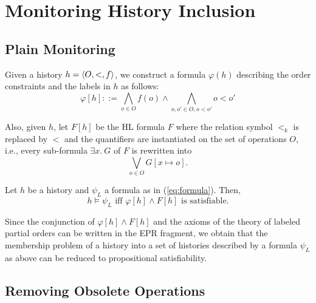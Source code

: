 
\section{Monitoring History Inclusion}

\subsection{Plain Monitoring}

Given a history $h=\left\langle {O,<,f} \right\rangle$, we construct a formula $\varphi(h)$ describing the order constraints
and the labels in $h$ as follows:
\[
\varphi[h]::= \bigwedge_{o\in O} f(o)\land \bigwedge_{o,o'\in O, o<o'} o< o'
\]

Also, given $h$, let $F[h]$ be the HL formula $F$ where the relation symbol $<_k$ is replaced by $<$
and the quantifiers are instantiated on the set of operations $O$, 
i.e., every sub-formula $\exists x.\ G$ of $F$ is rewritten into
\[
\bigvee_{o\in O} G[x\mapsto o].
\]

\begin{theorem}
Let $h$ be a history and $\psi_L$ a formula as in (\ref{eq:formula}). Then,
\[
h\models \psi_L\mbox{ iff }\varphi[h]\land F[h]\mbox{ is satisfiable.}
\]
\end{theorem}

Since the conjunction of $\varphi[h]\land F[h]$ and the axioms of the theory of 
labeled partial orders can be written in the EPR fragment, we obtain that the
membership problem of a history into a set of histories described by a formula $\psi_L$ as above
can be reduced to propositional satisfiability.

\subsection{Removing Obsolete Operations}